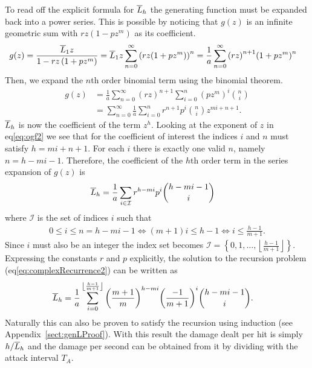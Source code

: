 To read off the explicit formula for $\overline{L}_h$ the generating function must be expanded back into a power series. This is possible by noticing that $g(z)$ is an infinite geometric sum with $rz(1 - pz^m)$ as its coefficient.
\begin{align}
    g(z) &= \frac{\overline{L}_1 z}{1 - rz\left(1 + pz^{m}\right)}\nonumber
    = \overline{L}_1 z\sum_{n=0}^\infty {(rz(1 + pz^m))}^n\nonumber
    = \frac{1}{a} \sum_{n=0}^\infty {(rz)}^{n+1}{(1 + pz^m)}^n
\end{align}
Then, we expand the $n$th order binomial term using the binomial theorem.
\begin{align}
    g(z) &= \frac{1}{a} \sum_{n=0}^\infty {(rz)}^{n+1}\sum_{i=0}^{n} {(pz^m)}^i {n \choose i}\nonumber\\
         &= \sum_{n=0}^\infty \frac{1}{a}\sum_{i=0}^{n} r^{n+1} p^i {n \choose i}z^{mi+n+1}\label{eq:ogf2}.
\end{align}
$\overline{L}_h$ is now the coefficient of the term $z^h$. Looking at the exponent of $z$ in eq\ref{eq:ogf2} we see that for the coefficient of interest the indices $i$ and $n$ must satisfy $h=mi+n+1$. For each $i$ there is exactly one valid $n$, namely $n = h-mi-1$.
Therefore, the coefficient of the $h$th order term in the series expansion of $g(z)$ is
\begin{align}
    \overline{L}_h &= \frac{1}{a}\sum_{i \in \mathcal{I}} r^{h-mi} p^i {h-mi-1 \choose i} \nonumber
\end{align}
where $\mathcal{I}$ is the set of indices $i$ such that
\begin{align*}
    0 \leq i \leq n = h-mi-1
    \iff (m+1)i \leq h-1
    \iff i \leq \frac{h-1}{m+1}.
\end{align*}
Since $i$ must also be an integer the index set becomes $\mathcal{I} = \left\{0,1,\ldots,\left\lfloor{\frac{h-1}{m+1}}\right\rfloor\right\}$. Expressing the constants $r$ and $p$ explicitly, the solution to the recursion problem (eq\ref{eq:complexRecurrence2}) can be written as
\begin{align}
    \overline{L}_h &= \frac{1}{a}\sum_{i=0}^{\left\lfloor{\frac{h-1}{m+1}}\right\rfloor} {\left(\frac{m+1}{m}\right)}^{h-mi} {\left(\frac{-1}{m+1}\right)}^i {h-mi-1 \choose i}.\label{eq:explicitL}
\end{align}
Naturally this can also be proven to satisfy the recursion using induction (see Appendix~\ref{sect:genLProof}). With this result the damage dealt per hit is simply $h/\overline{L}_h$ and the damage per second can be obtained from it by dividing with the attack interval $T_A$.

